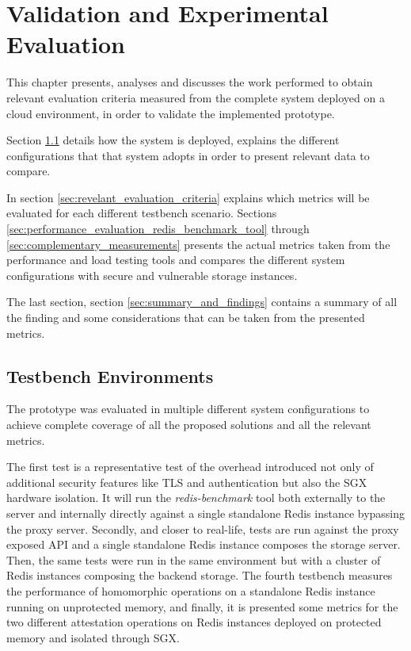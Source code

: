 
\chapter{Validation and Experimental Evaluation}
\label{cha:validation_experimental_Evaluation}

This chapter presents, analyses and discusses the work performed to obtain relevant evaluation criteria measured from the complete system deployed on a cloud environment, in order to validate the implemented prototype.

Section \ref{sec:testbench_environment} details how the system is deployed, explains the different configurations that that system adopts in order to present relevant data to compare.

In section \ref{sec:revelant_evaluation_criteria} explains which metrics will be evaluated for each different testbench scenario. Sections \ref{sec:performance_evaluation_redis_benchmark_tool} through \ref{sec:complementary_measurements} presents the actual metrics taken from the performance and load testing tools and compares the different system configurations with secure and vulnerable storage instances.

The last section, section \ref{sec:summary_and_findings} contains a summary of all the finding and some considerations that can be taken from the presented metrics.

\section{Testbench Environments}
\label{sec:testbench_environment}

The prototype was evaluated in multiple different system configurations to achieve complete coverage of all the proposed solutions and all the relevant metrics. 

The first test is a representative test of the overhead introduced not only of additional security features like \gls{TLS} and authentication but also the \gls{SGX} hardware isolation. It will run the \textit{redis-benchmark} tool both externally to the server and internally directly against a single standalone Redis instance bypassing the proxy server. Secondly, and closer to real-life, tests are run against the proxy exposed \gls{API} and a single standalone Redis instance composes the storage server. Then, the same tests were run in the same environment but with a cluster of Redis instances composing the backend storage. The fourth testbench measures the performance of homomorphic operations on a standalone Redis instance running on unprotected memory, and finally, it is presented some metrics for the two different attestation operations on Redis instances deployed on protected memory and isolated through \gls{SGX}.

